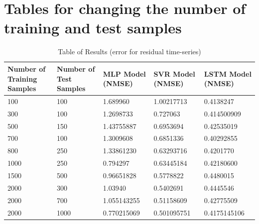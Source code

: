 \documentclass{article}
\begin{document}
\section{Tables for changing the number of training and test samples}

\begin{table}[ht]
	\centering
	\begin{tabular}{p{2cm} p{2cm} p{2cm} p{2cm} p{2cm}}
		\toprule
		Number of Training Samples & Number of Test Samples & MLP Model (NMSE) & SVR Model (NMSE) & LSTM Model (NMSE) \\
		\midrule
		100 & 100 & 1.689960 & 1.00217713 & 0.4138247 \\
		\midrule
		300 & 100 & 1.2698733 & 0.727063  & 0.414500909 \\
		\midrule
		500 & 150 & 1.43755887 & 0.6953694 & 0.42535019 \\
		\midrule
		700 & 100 & 1.3009608 & 0.6851336 & 0.40292855 \\
		\midrule
		800 & 250 & 1.33861230 & 0.63293716 & 0.4201770 \\
		\midrule
		1000 & 250 & 0.794297 & 0.63445184 & 0.42180600 \\
		\midrule
		1500 & 500 & 0.96651828 & 0.5778822 & 0.4480015 \\
		\midrule
		2000 & 300 & 1.03940 & 0.5402691 & 0.4445546 \\
		\midrule
		2000 & 700 & 1.055143255 & 0.51158609 & 0.42775509 \\
		\midrule
		2000 & 1000 & 0.770215069 & 0.501095751 & 0.4175145106 \\
		\bottomrule
	\end{tabular}
	\caption{Table of Results (error for residual time-series)}
\end{table}
\end{document}
